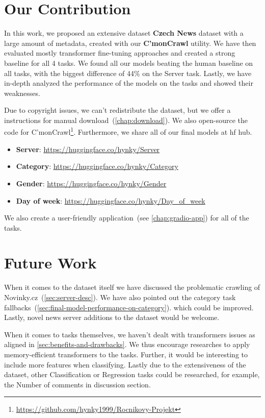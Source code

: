 \section{Our Contribution}
In this work, we proposed an extensive dataset \textbf{Czech News} dataset with a large amount of metadata,
created with our \textbf{C'monCrawl} utility. We have then evaluated mostly
transformer fine-tuning approaches
and created a strong baseline for all 4 tasks. We found all our models
beating the human baseline on all tasks, with the biggest difference of 44\% on the Server task.
Lastly, we have in-depth analyzed the performance of the models on the tasks
and showed their weaknesses.

Due to copyright issues, we can't redistribute the dataset, but we offer a instructions
for manual download~(\autoref{chap:download}).
We also open-source the code for C'monCrawl\footnote{\url{https://github.com/hynky1999/Rocnikovy-Projekt}}.
Furthermore, we share all of our final models at \ac{hf} hub.
\begin{itemize}
    \item \textbf{Server}: \url{https://huggingface.co/hynky/Server}
    \item \textbf{Category}: \url{https://huggingface.co/hynky/Category}
    \item \textbf{Gender}: \url{https://huggingface.co/hynky/Gender}
    \item \textbf{Day of week}: \url{https://huggingface.co/hynky/Day_of_week}
\end{itemize}
We also create a user-friendly application~(see \autoref{chap:gradio-app})
for all of the tasks.

\section{Future Work}
When it comes to the dataset itself we have discussed the problematic crawling of 
Novinky.cz~(\autoref{sec:server-desc}). We have also
pointed out the category task fallbacks~(\autoref{sec:final-model-performance-on-category}).
which could be improved. Lastly, novel news server additions to the dataset would be 
welcome.

When it comes to tasks themselves, we haven't dealt with transformers issues as 
aligned in \autoref{sec:benefits-and-drawbacks}. We thus encourage researches
to apply memory-efficient transformers to the tasks. Further, it would be 
interesting to include more features when classifying.
Lastly due to the extensiveness of the dataset, other Classification or Regression tasks
could be researched, for example, the Number of comments in discussion section.






